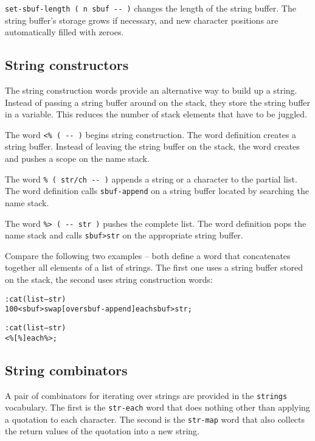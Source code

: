 \documentclass[english]{article}
\begin{document}
\texttt{set-sbuf-length ( n sbuf -{}- )} changes the length of the
string buffer. The string buffer's storage grows if necessary, and
new character positions are automatically filled with zeroes.


\subsection{String constructors}

The string construction words provide an alternative way to build up a string. Instead of passing a string buffer around on the stack, they store the string buffer in a variable. This reduces the number
of stack elements that have to be juggled.

The word \texttt{<\% ( -{}- )} begins string construction. The word
definition creates a string buffer. Instead of leaving the string
buffer on the stack, the word creates and pushes a scope on the name
stack.

The word \texttt{\% ( str/ch -{}- )} appends a string or a character
to the partial list. The word definition calls \texttt{sbuf-append}
on a string buffer located by searching the name stack.

The word \texttt{\%> ( -{}- str )} pushes the complete list. The word
definition pops the name stack and calls \texttt{sbuf>str} on the
appropriate string buffer.

Compare the following two examples -- both define a word that concatenates together all elements of a list of strings. The first one uses a string buffer stored on the stack, the second uses string construction words:

\begin{alltt}
: cat ( list -- str )
    100 <sbuf> swap [ over sbuf-append ] each sbuf>str ;

: cat ( list -- str )
    <\% [ \% ] each \%> ;
\end{alltt}

\subsection{String combinators}

A pair of combinators for iterating over strings are provided in the \texttt{strings} vocabulary. The first is the \texttt{str-each} word that does nothing other than applying a quotation to each character. The second is the \texttt{str-map} word that also collects the return values of the quotation into a new string.
\end{document}
